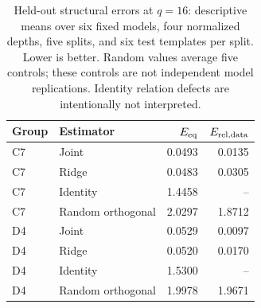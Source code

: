\begin{table}[t]
\caption{Held-out structural errors at $q=16$: descriptive means over six fixed models, four normalized depths, five splits, and six test templates per split. Lower is better. Random values average five controls; these controls are not independent model replications. Identity relation defects are intentionally not interpreted.}
\label{tab:structural-main}
\centering
\small
\begin{tabular}{llrr}
\toprule
Group & Estimator & $E_{\rm eq}$ & $E_{\rm rel,data}$ \\
\midrule
C7 & Joint & 0.0493 & 0.0135 \\
C7 & Ridge & 0.0483 & 0.0305 \\
C7 & Identity & 1.4458 & -- \\
C7 & Random orthogonal & 2.0297 & 1.8712 \\
\midrule
D4 & Joint & 0.0529 & 0.0097 \\
D4 & Ridge & 0.0520 & 0.0170 \\
D4 & Identity & 1.5300 & -- \\
D4 & Random orthogonal & 1.9978 & 1.9671 \\
\bottomrule
\end{tabular}
\end{table}
